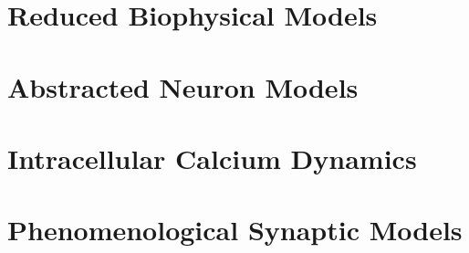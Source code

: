 \documentclass[12pt]{article}
\begin{document}
\section{Reduced Biophysical Models}
\graphicspath{ {./images/09/} }

\newpage

\section{Abstracted Neuron Models}
\graphicspath{ {./images/10/} }

\newpage

\section{Intracellular Calcium Dynamics}
\graphicspath{ {./images/11/} }

\newpage

\section{Phenomenological Synaptic Models}
\graphicspath{ {./images/12/} }

\newpage
\end{document}

